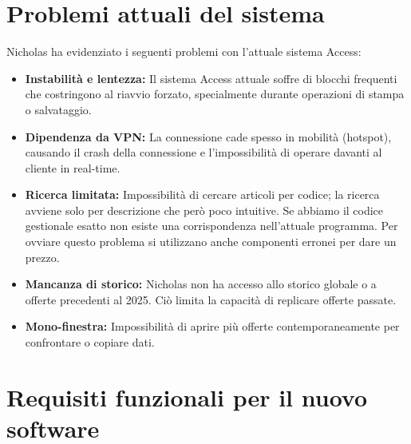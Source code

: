 \documentclass[12pt, a4paper]{article} %
\begin{document}
\section{Problemi attuali del sistema}
Nicholas ha evidenziato i seguenti problemi con l'attuale sistema Access:
\begin{itemize}
      \item \textbf{Instabilità e lentezza:} Il sistema Access attuale soffre di blocchi frequenti che costringono al riavvio forzato,
            specialmente durante operazioni di stampa o salvataggio.
      \item \textbf{Dipendenza da VPN:} La connessione cade spesso in mobilità (hotspot),
            causando il crash della connessione e l'impossibilità di operare davanti al cliente in real-time.
      \item \textbf{Ricerca limitata:} Impossibilità di cercare articoli per codice; la ricerca avviene solo per descrizione che però poco intuitive.
            Se abbiamo il codice gestionale esatto non esiste una corrispondenza nell'attuale programma.
            Per ovviare questo problema si utilizzano anche componenti erronei per dare un prezzo.
      \item \textbf{Mancanza di storico:} Nicholas non ha accesso allo storico globale o a offerte precedenti al 2025. Ciò limita la capacità di replicare offerte passate.
      \item \textbf{Mono-finestra:} Impossibilità di aprire più offerte contemporaneamente per confrontare o copiare dati.

\end{itemize}

\section{Requisiti funzionali per il nuovo software}
\end{document}
